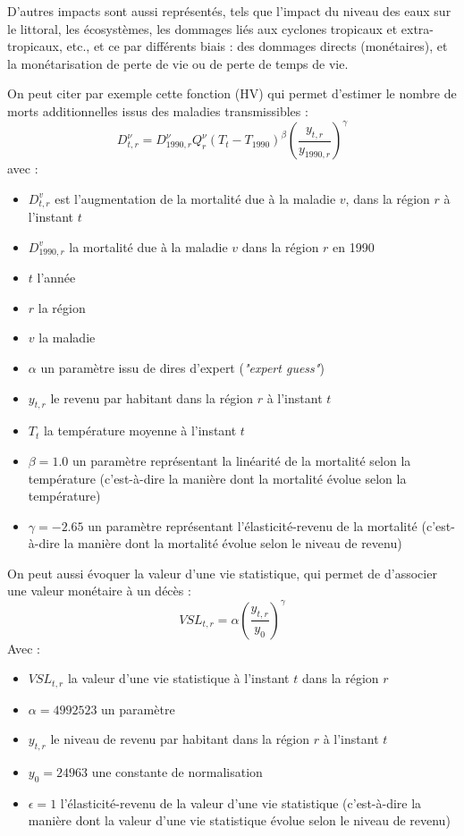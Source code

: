 D'autres impacts sont aussi représentés, tels que l'impact du niveau des eaux sur le littoral, les écosystèmes, les dommages liés aux cyclones tropicaux et extra-tropicaux, etc., et ce par différents biais : des dommages directs (monétaires), et la monétarisation de perte de vie ou de perte de temps de vie. 

On peut citer par exemple cette fonction (HV) qui permet d'estimer le nombre de morts additionnelles issus des maladies transmissibles  :  
\begin{equation}
    D_{t,r}^{\nu}=D_{1990,r}^{\nu}Q_{r}^{\nu}\left(T_{t}-T_{1990}\right)^{\beta}\left(\frac{y_{t,r}}{y_{1990,r}}\right)^{\gamma}
    \label{eq:fund_HV}
\end{equation}
avec : 
\begin{itemize}
    \item $D^v_{t,r}$ est l'augmentation de la mortalité due à la maladie $v$, dans la région $r$ à l'instant $t$ 
    \item $D^v_{1990,r}$ la mortalité due à la maladie $v$ dans la région $r$ en 1990
    \item $t$ l'année
    \item $r$ la région
    \item $v$ la maladie
    \item $\alpha$ un paramètre issu de dires d'expert (\emph{"expert guess"})
    \item $y_{t,r}$ le revenu par habitant dans la région $r$ à l'instant $t$ 
    \item $T_t$ la température moyenne à l'instant $t$
    \item $\beta = 1.0$ un paramètre représentant la linéarité de la mortalité selon la température (c'est-à-dire la manière dont la mortalité évolue selon la température)
    \item $\gamma = -2.65$ un paramètre représentant l'élasticité-revenu de la mortalité (c'est-à-dire la manière dont la mortalité évolue selon le niveau de revenu)  
\end{itemize}

\vspace{15pt}

On peut aussi évoquer la valeur d'une vie statistique, qui permet de d'associer une valeur monétaire à un décès : 
\begin{equation}
    V S L_{t,r}=\alpha\left(\frac{y_{t,r}}{y_{0}}\right)^{\gamma}
    \label{eq:VSL}
\end{equation}
Avec : 
\begin{itemize}
    \item $VSL_{t,r}$ la valeur d'une vie statistique à l'instant $t$ dans la région $r$
    \item $\alpha = 4992523$ un paramètre
    \item $y_{t,r}$ le niveau de revenu par habitant dans la région $r$ à l'instant $t$ 
    \item $y_0 = 24963$ une constante de normalisation
    \item $\epsilon = 1$ l'élasticité-revenu de la valeur d'une vie statistique (c'est-à-dire la manière dont la valeur d'une vie statistique évolue selon le niveau de revenu)
\end{itemize}

